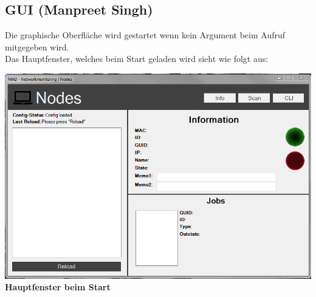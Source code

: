 \documentclass[12pt,a4paper]{report}
\begin{document}
\begin{onehalfspace}
\chapter{GUI (Manpreet Singh)}
Die graphische Oberfläche wird gestartet wenn kein Argument beim Aufruf mitgegeben wird.\\
Das Hauptfenster, welches beim Start geladen wird sieht wie folgt aus:
\begin{center}
\includegraphics[scale=0.7]{../docs/lyaton/graphics/GUI_v3_start.png}\\
\textbf{Hauptfenster beim Start}
\end{center}


\end{onehalfspace}
\end{document}
